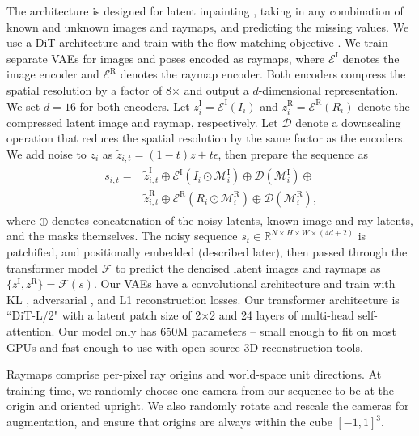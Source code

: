 %
The architecture is designed for latent inpainting \cite{rombach2022high}, taking in any combination of known and unknown images and raymaps, and predicting the missing values.
We use a DiT architecture \cite{peebles2023scalable} and train with the flow matching objective \cite{lipman2022flow}.
We train separate VAEs for images and poses encoded as raymaps, where $\mathcal{E}^\text{I}$ denotes the image encoder and $\mathcal{E}^\text{R}$ denotes the raymap encoder.
Both encoders compress the spatial resolution by a factor of 8$\times$ and output a $d$-dimensional representation.
We set $d=16$ for both encoders.
Let $z^\text{I}_{i} = \mathcal{E}^\text{I}(I_{i})$ and $z^\text{R}_{i} = \mathcal{E}^\text{R}(R_{i})$ denote the compressed latent image and raymap, respectively.
Let $\mathcal{D}$ denote a downscaling operation that reduces the spatial resolution by the same factor as the encoders.
We add noise to $z_{i}$ as $\tilde{z}_{i,t} = (1 - t) z + t \epsilon$, then prepare the sequence as
%
\begin{align}
\begin{split}
s_{i,t} = {} & \tilde{z}^\text{I}_{i,t} \oplus \mathcal{E}^\text{I}(I_{i} \odot \mathcal{M}_{i}^\text{I}) \oplus \mathcal{D}(\mathcal{M}_{i}^\text{I}) \oplus {} \\
 & \tilde{z}^\text{R}_{i,t} \oplus \mathcal{E}^\text{R}(R_{i} \odot \mathcal{M}_{i}^\text{R}) \oplus \mathcal{D}(\mathcal{M}_{i}^\text{R}) \text{,}
\label{eq:sequence_equation}
\end{split}
\end{align}
%
where $\oplus$ denotes concatenation of the noisy latents, known image and ray latents, and the masks themselves.
The noisy sequence $s_{t} \in \mathbb{R}^{N \times H \times W \times (4d+2)}$ is patchified, and positionally embedded (described later), then passed through the transformer model $\mathcal{F}$ to predict the denoised latent images and raymaps as $\{z^\text{I}, z^\text{R}\} = \mathcal{F}(s)$.
Our VAEs have a convolutional architecture \cite{rombach2022high} and train with KL \cite{kingma2013auto}, adversarial \cite{goodfellow2014generative}, and L1 reconstruction losses.
Our transformer architecture is ``DiT-L/2" \cite{peebles2023scalable} with a latent patch size of 2$\times$2 and 24 layers of multi-head self-attention.
Our model only has 650M parameters – small enough to fit on most GPUs and fast enough to use with open-source 3D reconstruction tools.

%
%
Raymaps comprise per-pixel ray origins and world-space unit directions.
At training time, we randomly choose one camera from our sequence to be at the origin and oriented upright.
We also randomly rotate and rescale the cameras for augmentation, and ensure that origins are always within the cube $[-1, 1]^3$.
%

